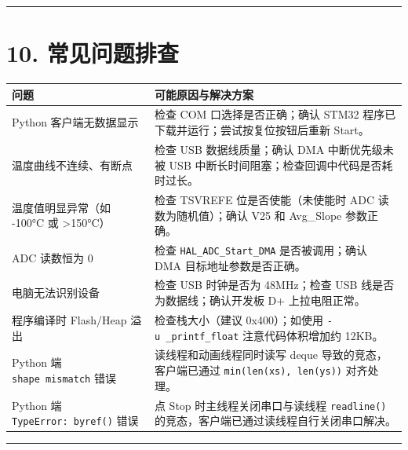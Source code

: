 \documentclass[
  chinese,
  UTF8,
  oneside,
  openany]{ctexbook}
\begin{document}
\begin{center}\rule{0.5\linewidth}{0.5pt}\end{center}

\section{10. 常见问题排查}\label{ux5e38ux89c1ux95eeux9898ux6392ux67e5-2}

\begin{longtable}[]{@{}
  >{\raggedright\arraybackslash}p{}
  >{\raggedright\arraybackslash}p{}@{}}
\toprule\noalign{}
\begin{minipage}[b]{\linewidth}\raggedright
问题
\end{minipage} & \begin{minipage}[b]{\linewidth}\raggedright
可能原因与解决方案
\end{minipage} \\
\midrule\noalign{}
\endhead
\bottomrule\noalign{}
\endlastfoot
Python 客户端无数据显示 & 检查 COM 口选择是否正确；确认 STM32
程序已下载并运行；尝试按复位按钮后重新 Start。 \\
温度曲线不连续、有断点 & 检查 USB 数据线质量；确认 DMA 中断优先级未被
USB 中断长时间阻塞；检查回调中代码是否耗时过长。 \\
温度值明显异常（如 -100°C 或 \textgreater150°C） & 检查 TSVREFE
位是否使能（未使能时 ADC 读数为随机值）；确认 V25 和 Avg\_Slope
参数正确。 \\
ADC 读数恒为 0 & 检查 \texttt{HAL\_ADC\_Start\_DMA} 是否被调用；确认 DMA
目标地址参数是否正确。 \\
电脑无法识别设备 & 检查 USB 时钟是否为 48MHz；检查 USB
线是否为数据线；确认开发板 D+ 上拉电阻正常。 \\
程序编译时 Flash/Heap 溢出 & 检查栈大小（建议 0x400）；如使用
\texttt{-u\ \_printf\_float} 注意代码体积增加约 12KB。 \\
Python 端 \texttt{shape\ mismatch} 错误 & 读线程和动画线程同时读写 deque
导致的竞态，客户端已通过 \texttt{min(len(xs),\ len(ys))} 对齐处理。 \\
Python 端 \texttt{TypeError:\ byref()} 错误 & 点 Stop
时主线程关闭串口与读线程 \texttt{readline()}
的竞态，客户端已通过读线程自行关闭串口解决。 \\
\end{longtable}

\begin{center}\rule{0.5\linewidth}{0.5pt}\end{center}
\end{document}
